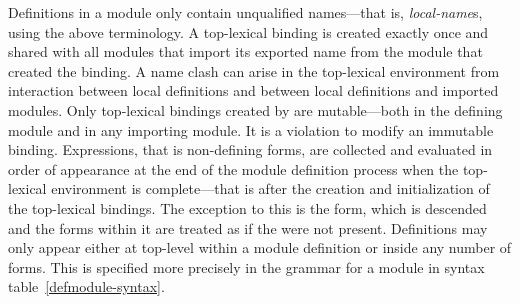 %
\begin{optDefinition}
Definitions in a module only contain unqualified names---that is, {\em
    local-name}s, using the above terminology.  A top-lexical binding is created
exactly once and shared with all modules that import its exported name from the
module that created the binding.  A name clash can arise in the top-lexical
environment from interaction between local definitions and between local
definitions and imported modules.  Only top-lexical bindings created by
 are mutable---both in the defining module and in any
importing module.  It is a violation to modify an immutable binding.
Expressions, that is non-defining forms, are collected and evaluated in order of
appearance at the end of the module definition process when the top-lexical
environment is complete---that is after the creation and initialization of the
top-lexical bindings.  The exception to this is the  form,
which is descended and the forms within it are treated as if the
 were not present.  Definitions may only appear either at
top-level within a module definition or inside any number of 
forms.  This is specified more precisely in the grammar for a module
in syntax table~\ref{defmodule-syntax}.
%
\end{optDefinition}

